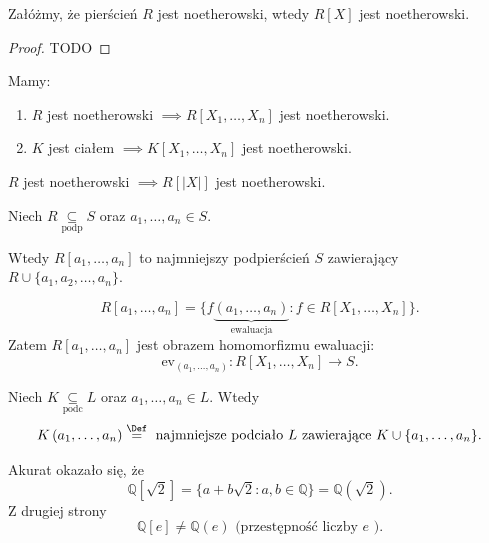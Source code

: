 \begin{theorem}
	Załóżmy, że pierścień $R$ jest noetherowski,  wtedy $R\left[ X \right] $ jest noetherowski.
\end{theorem} 
\begin{proof}
	TODO
\end{proof} 
\begin{corollary}
	Mamy:
	\begin{enumerate}[label=\arabic*)]
		\item $R$ jest noetherowski $\implies R\left[ X_1,\ldots,X_{n}  \right] $ jest noetherowski.
		\item $K$ jest ciałem $\implies K\left[ X_1,\ldots,X_{n}  \right] $ jest noetherowski.
	\end{enumerate}
\end{corollary}
\begin{theorem}
	$R$ jest noetherowski $\implies R\left[ \left| X \right|  \right] $ jest noetherowski.
\end{theorem} 
\begin{definition}
	Niech $R\underset{\scriptscriptstyle\text{podp}}{\subseteq} S$ oraz $a_1,\ldots,a_{n} \in S$. 

	Wtedy $R\left[ a_1,\ldots,a_{n}  \right] $ to najmniejszy podpierścień $S$ zawierający $R\cup \{a_1,a_2,\ldots, a_{n} \} $.
\end{definition} 
\begin{remark}
	\[
	R\left[ a_1,\ldots,a_{n}  \right] = \{f\underbrace{(a_1,\ldots,a_{n})}_{\text{ewaluacja}}: f\in R\left[ X_1,\ldots,X_{n}  \right] \} 
	.\] 
	Zatem $R\left[ a_1,\ldots,a_{n}  \right] $ jest obrazem homomorfizmu ewaluacji:
	\[
	\text{ev}_{\left( a_1,\ldots,a_{n}  \right) }: R\left[ X_1,\ldots,X_{n}  \right] \to S
	.\] 
\end{remark}
\begin{definition}
	Niech $K\underset{\scriptscriptstyle\text{podc}}{\subseteq} L$ oraz $a_1,\ldots,a_{n} \in L$.
	Wtedy
	\[
	K\left( a_1,\ldots,a_{n}  \right) \overset{\Def}{=} \text{ najmniejsze podciało $L$ zawierające } K\cup \{a_1,\ldots,a_{n} \} 
	.\] 
\end{definition} 
\begin{remark}
	Akurat okazało się, że
	\[
	\mathbb{Q} \left[ \sqrt{2}  \right] = \{a + b\sqrt{2} : a,b \in \mathbb{Q} \} = \mathbb{Q} \left( \sqrt{2}  \right) 
	.\] 
	Z drugiej strony \[
	\mathbb{Q} \left[ e \right] \neq \mathbb{Q} \left( e \right) \text{ (przestępność liczby $e$ )}
	.\] 
\end{remark}
